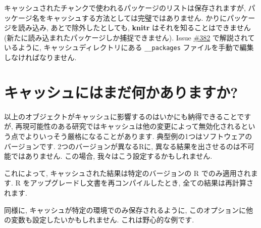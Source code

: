 \documentclass[
  lualatex,ja=standard,jafont=noto-otf]{bxjsreport}
\newenvironment{Shaded}{\begin{snugshade}}{\end{snugshade}}
\newcommand{\AttributeTok}[1]{\textcolor[rgb]{0.13,0.29,0.53}{#1}}
\newcommand{\CommentTok}[1]{\textcolor[rgb]{0.56,0.35,0.01}{\textit{#1}}}
\newcommand{\DocumentationTok}[1]{\textcolor[rgb]{0.56,0.35,0.01}{\textbf{\textit{#1}}}}
\newcommand{\FunctionTok}[1]{\textcolor[rgb]{0.13,0.29,0.53}{\textbf{#1}}}
\newcommand{\NormalTok}[1]{#1}
\newcommand{\SpecialCharTok}[1]{\textcolor[rgb]{0.81,0.36,0.00}{\textbf{#1}}}
\newcommand{\StringTok}[1]{\textcolor[rgb]{0.31,0.60,0.02}{#1}}
\begin{document}
キャッシュされたチャンクで使われるパッケージのリストは保存されますが,
パッケージ名をキャッシュする方法としては完璧ではありません.
かりにパッケージを読み込み, あとで除外したとしても, \textbf{knitr}
はそれを知ることはできません
(新たに読み込まれたパッケージしか捕捉できません). Issue
\href{https://github.com/yihui/knitr/issues/382}{\#382}
で解説されているように, キャッシュディレクトリにある
\texttt{\_\_packages} ファイルを手動で編集しなければなりません.

\hypertarget{ux30adux30e3ux30c3ux30b7ux30e5ux306bux306fux307eux3060ux4f55ux304bux3042ux308aux307eux3059ux304b}{%
\section*{キャッシュにはまだ何かありますか?}\label{ux30adux30e3ux30c3ux30b7ux30e5ux306bux306fux307eux3060ux4f55ux304bux3042ux308aux307eux3059ux304b}}

以上のオブジェクトがキャッシュに影響するのはいかにも納得できることですが,
再現可能性のある研究ではキャッシュは他の変更によって無効化されるという点でよりいっそう厳格になることがあります.
典型例の1つはソフトウェアのバージョンです. 2つのバージョンが異なるRに,
異なる結果を出させるのは不可能ではありません. この場合,
我々はこう設定するかもしれません.

\begin{Shaded}
\end{Shaded}

これによって, キャッシュされた結果は特定のバージョンの R
でのみ適用されます. R をアップグレードし文書を再コンパイルしたとき,
全ての結果は再計算されます.

同様に, キャッシュが特定の環境でのみ保存されるように,
このオプションに他の変数も設定したいかもしれません.
これは野心的な例です.

\begin{Shaded}
\end{Shaded}
\end{document}
